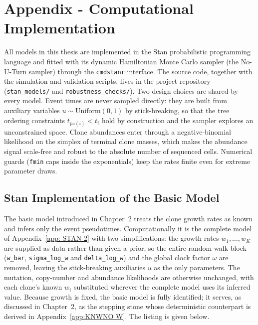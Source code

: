 \chapter{Appendix - Computational Implementation}

All models in this thesis are implemented in the Stan probabilistic programming
language and fitted with its dynamic Hamiltonian Monte Carlo sampler (the No-U-Turn
sampler) through the \texttt{cmdstanr} interface. The source code, together with the
simulation and validation scripts, lives in the project repository
(\texttt{stan\_models/} and \texttt{robustness\_checks/}). Two design choices are
shared by every model. Event times are never sampled directly: they are built from
auxiliary variables $u\sim\mathrm{Uniform}(0,1)$ by stick-breaking, so that the tree
ordering constraints $t_{\mathrm{pa}(i)}<t_i$ hold by construction and the sampler explores
an unconstrained space. Clone abundances enter through a negative-binomial
likelihood on the simplex of terminal clone masses, which makes the abundance signal
scale-free and robust to the absolute number of sequenced cells. Numerical guards
(\texttt{fmin} caps inside the exponentials) keep the rates finite even for extreme
parameter draws.

\section{Stan Implementation of the Basic Model}
\label{app: STAN 1}

The basic model introduced in Chapter~2 treats the clone growth rates as known and
infers only the event pseudotimes. Computationally it is the complete model of
Appendix~\ref{app: STAN 2} with two simplifications: the growth rates
$w_1,\dots,w_K$ are supplied as data rather than given a prior, so the entire
random-walk block (\texttt{w\_bar}, \texttt{sigma\_log\_w} and \texttt{delta\_log\_w})
and the global clock factor $\omega$ are removed, leaving the stick-breaking
auxiliaries $u$ as the only parameters. The mutation, copy-number and abundance
likelihoods are otherwise unchanged, with each clone's known $w_i$ substituted
wherever the complete model uses its inferred value. Because growth is fixed, the
basic model is fully identified; it serves, as discussed in Chapter~2, as the
stepping stone whose deterministic counterpart is derived in
Appendix~\ref{app:KNWNO W}. The listing is given below.



